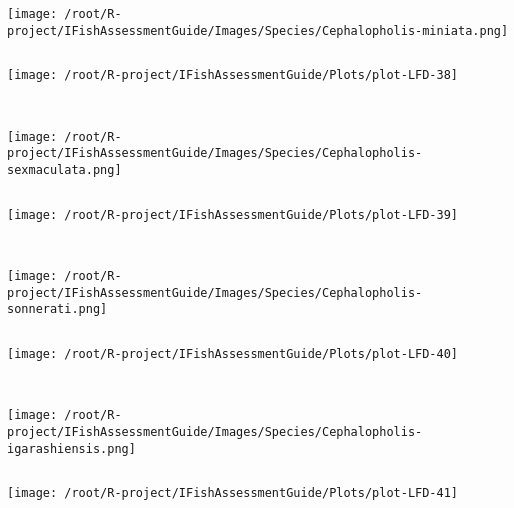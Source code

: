 \begin{knitrout}
\begin{kframe}
\begin{verbatim}
\end{verbatim}
\end{kframe}
\texttt{[image: /root/R-project/IFishAssessmentGuide/Images/Species/Cephalopholis-miniata.png]}
\begin{kframe}\begin{verbatim}
\end{verbatim}
\end{kframe}
\texttt{[image: /root/R-project/IFishAssessmentGuide/Plots/plot-LFD-38]} 
\begin{kframe}\begin{verbatim}
 
\end{verbatim}
\end{kframe}
\texttt{[image: /root/R-project/IFishAssessmentGuide/Images/Species/Cephalopholis-sexmaculata.png]}
\begin{kframe}\begin{verbatim}
\end{verbatim}
\end{kframe}
\texttt{[image: /root/R-project/IFishAssessmentGuide/Plots/plot-LFD-39]} 
\begin{kframe}\begin{verbatim}
 
\end{verbatim}
\end{kframe}
\texttt{[image: /root/R-project/IFishAssessmentGuide/Images/Species/Cephalopholis-sonnerati.png]}
\begin{kframe}\begin{verbatim}
\end{verbatim}
\end{kframe}
\texttt{[image: /root/R-project/IFishAssessmentGuide/Plots/plot-LFD-40]} 
\begin{kframe}\begin{verbatim}
 
\end{verbatim}
\end{kframe}
\texttt{[image: /root/R-project/IFishAssessmentGuide/Images/Species/Cephalopholis-igarashiensis.png]}
\begin{kframe}\begin{verbatim}
\end{verbatim}
\end{kframe}
\texttt{[image: /root/R-project/IFishAssessmentGuide/Plots/plot-LFD-41]} 
\begin{kframe}\begin{verbatim}
 

\end{verbatim}
\end{kframe}
\end{knitrout}
